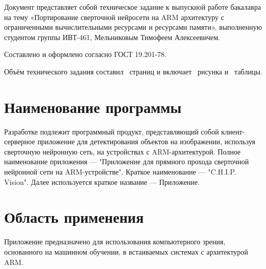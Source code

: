 \documentclass[a4paper,english]{G2-105}
\begin{document}
\VSTUMakeCenteredTOC
{}
\VSTUSetDocumentNumbersPrefix{}
 \ttl
\par Документ представляет собой техническое задание к выпускной работе бакалавра на тему «Портирование сверточной нейросети на ARM архитектуру с ограниченными вычислительными ресурсами и ресурсами памяти», выполненную студентом группы ИВТ-461, Мельниковым Тимофеем Алексеевичем.
\par Составлено и оформлено согласно ГОСТ 19.201-78.
\par Объём технического задания составил \totalpages~страниц и включает \totalfigures~рисунка и \totaltables~таблицы. 
\VSTUInitializeTZ
\tableofcontents
\newpage

 \ttl \ttl

\section{Наименование программы} \ttl
\par Разработке подлежит программный продукт, представляющий собой клиент-серверное приложение для детектирования объектов на изображении, используя сверточную нейронную сеть, на устройствах с ARM-архитектурой.
Полное наименование приложения --- "Приложение для прямного прохода сверточной нейронной сети на ARM-устройстве". Краткое наименование --- "C.H.I.P. Vision". Далее используется краткое название --- Приложение.
\ttl

\section{Область применения} \ttl
\par Приложение предназначено для использования компьютерного зрения, основанного на машинном обучении, в встаиваемых системах с архитектурой ARM.
\ttl \ttl \ttl
\end{document}
